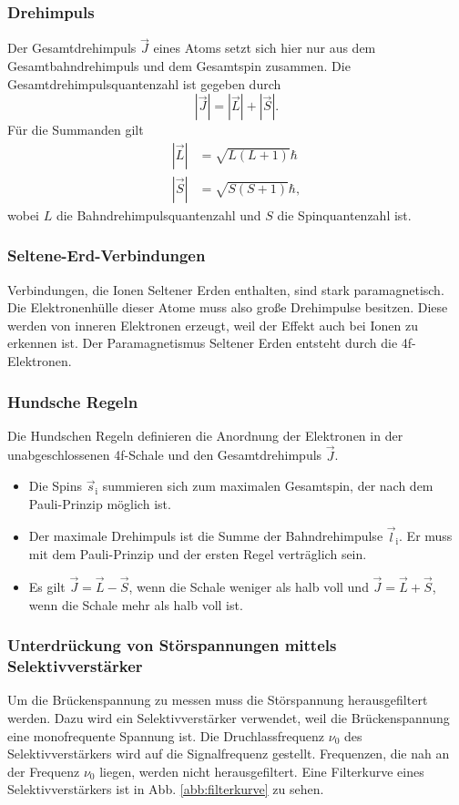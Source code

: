 \subsubsection{Drehimpuls}
Der Gesamtdrehimpuls $\vec{J}$ eines Atoms setzt sich hier nur aus dem Gesamtbahndrehimpuls und dem Gesamtspin 
zusammen. Die Gesamtdrehimpulsquantenzahl ist gegeben durch
\begin{equation*}
    |\vec{J}| = |\vec{L}| + |\vec{S}|.
\end{equation*}
Für die Summanden gilt
\begin{align*}
   |\vec{L}| &= \sqrt{L(L+1)} \hbar \\
   |\vec{S}| &= \sqrt{S(S+1)} \hbar,
\end{align*}
wobei $L$ die Bahndrehimpulsquantenzahl und $S$ die Spinquantenzahl ist.

\subsubsection{Seltene-Erd-Verbindungen}
Verbindungen, die Ionen Seltener Erden enthalten, sind stark paramagnetisch. 
Die Elektronenhülle dieser Atome muss also große Drehimpulse besitzen. 
Diese werden von inneren Elektronen erzeugt, weil der Effekt auch bei Ionen zu erkennen ist. 
Der Paramagnetismus Seltener Erden entsteht durch die 4f-Elektronen. %


\subsubsection{Hundsche Regeln}
Die Hundschen Regeln definieren die Anordnung der Elektronen
in der unabgeschlossenen 4f-Schale
und den Gesamtdrehimpuls $\vec{J}$.
\begin{itemize}
\item Die Spins $\vec{s}_\text{i}$ summieren sich zum maximalen Gesamtspin, der nach dem 
Pauli-Prinzip möglich ist.
\item Der maximale Drehimpuls ist die Summe der Bahndrehimpulse $\vec{l}_\text{i}$. Er 
muss mit dem Pauli-Prinzip und der ersten Regel verträglich sein. 
\item Es gilt $\vec{J}= \vec{L} - \vec{S}$, wenn die Schale weniger als halb voll und 
$\vec{J}= \vec{L} + \vec{S}$, wenn die Schale mehr als halb voll ist.
\end{itemize}

\subsubsection{Unterdrückung von Störspannungen mittels Selektivverstärker}
Um die Brückenspannung zu messen muss die Störspannung herausgefiltert werden. 
Dazu wird ein Selektivverstärker verwendet, weil
die Brückenspannung eine monofrequente Spannung ist. Die Druchlassfrequenz $\nu_0$ des 
Selektivverstärkers wird auf die Signalfrequenz gestellt. 
Frequenzen, die nah an der Frequenz $\nu_0$ liegen, werden nicht herausgefiltert.
Eine Filterkurve eines Selektivverstärkers ist in Abb. \ref{abb:filterkurve} zu sehen.

